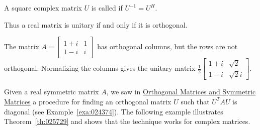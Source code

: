 \documentclass{ximera}
\begin{document}
\begin{definition}\label{def:Unitary}
A square complex matrix $U$ is called  if $U^{-1} = U^{H}$.
\end{definition}

Thus a real matrix is unitary if and only if it is orthogonal.


\begin{example}\label{ex:025787}
The matrix $A = \left[ \begin{array}{rr}
1 + i & 1 \\
1 - i & i
\end{array}\right]$ has orthogonal columns, but the rows are not orthogonal. Normalizing the columns gives the unitary matrix $\frac{1}{2}\left[ \begin{array}{rr}
	1 + i & \sqrt{2} \\
	1 - i & \sqrt{2}i
\end{array}\right]$.
\end{example}

Given a real symmetric matrix $A$, we saw in \href{https://ximera.osu.edu/oerlinalg/LinearAlgebra/RTH-0035/main}{Orthogonal Matrices and Symmetric Matrices} a procedure for finding an orthogonal matrix $U$ such that $U^{T}AU$ is diagonal (see Example~\ref{exa:024374}). The following example illustrates Theorem~\ref{th:025729} and shows that the technique works for complex matrices.
\end{document}
